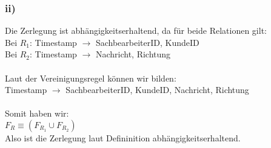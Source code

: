\subsubsection*{ii)}
Die Zerlegung ist abhängigkeitserhaltend, da für beide Relationen gilt: \\
Bei $ R_1 $: Timestamp $ \rightarrow  $ SachbearbeiterID, KundeID \\
Bei $ R_2 $: Timestamp $ \rightarrow  $ Nachricht, Richtung \\\\
Laut der Vereinigungsregel können wir bilden: \\
Timestamp $ \rightarrow  $ SachbearbeiterID, KundeID, Nachricht, Richtung \\\\
Somit haben wir:\\
$ F_R \equiv (F_{R_1} \cup F_{R_2})$\\
Also ist die Zerlegung laut Defininition abhängigkeitserhaltend.
